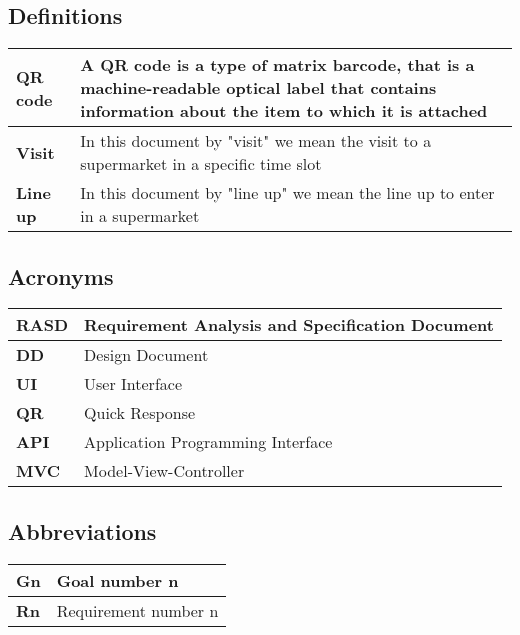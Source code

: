\subsection{Definitions}

    \begin{center}
        {\renewcommand{\arraystretch}{2}%
        \begin{tabular}{L{2cm}L{12cm}}
            \hline
            \textbf{QR code} & A QR code is a type of matrix barcode, that is a machine-readable optical label that 
            contains information about the item to which it is attached \\
            \hline
            \textbf{Visit} & In this document by "visit" we mean the visit to a supermarket in a specific time slot \\
            \hline
            \textbf{Line up} & In this document by "line up" we mean the line up to enter in a supermarket \\
            \hline
        \end{tabular}}
    \end{center}
    

\subsection{Acronyms}

    \begin{center}
        {\renewcommand{\arraystretch}{2}%
        \begin{tabular}{L{2cm}L{12cm}}
            \hline
            \textbf{RASD} & Requirement Analysis and Specification Document \\
            \hline
            \textbf{DD} & Design Document \\
            \hline
            \textbf{UI} & User Interface \\
            \hline
            \textbf{QR} & Quick Response \\
            \hline
            \textbf{API} & Application Programming Interface \\
            \hline
            \textbf{MVC} & Model-View-Controller \\
            \hline
        \end{tabular}}
    \end{center}

\subsection{Abbreviations}

    \begin{center}
        {\renewcommand{\arraystretch}{2}%
        \begin{tabular}{L{2cm}L{12cm}}
            \hline
            \textbf{Gn} & Goal number n \\
            \hline
            \textbf{Rn} & Requirement number n \\
            \hline
        \end{tabular}}
    \end{center}